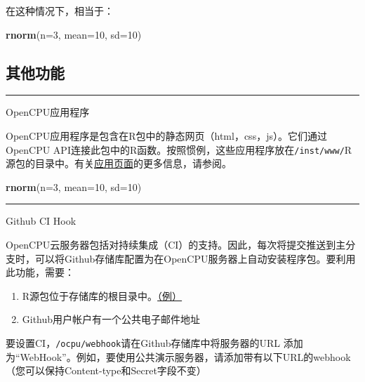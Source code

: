 \documentclass[]{book}
\newenvironment{Shaded}{\begin{snugshade}}{\end{snugshade}}
\newcommand{\KeywordTok}[1]{\textcolor[rgb]{0.13,0.29,0.53}{\textbf{#1}}}
\newcommand{\DataTypeTok}[1]{\textcolor[rgb]{0.13,0.29,0.53}{#1}}
\newcommand{\DecValTok}[1]{\textcolor[rgb]{0.00,0.00,0.81}{#1}}
\newcommand{\NormalTok}[1]{#1}
\providecommand{\tightlist}{%
  \setlength{\itemsep}{0pt}\setlength{\parskip}{0pt}}
\begin{document}
在这种情况下，相当于：

\begin{Shaded}
\begin{Highlighting}[]
\KeywordTok{rnorm}\NormalTok{(}\DataTypeTok{n=}\DecValTok{3}\NormalTok{, }\DataTypeTok{mean=}\DecValTok{10}\NormalTok{, }\DataTypeTok{sd=}\DecValTok{10}\NormalTok{)}
\end{Highlighting}
\end{Shaded}

\subsection{其他功能}

\begin{center}\rule{0.5\linewidth}{\linethickness}\end{center}

OpenCPU应用程序

OpenCPU应用程序是包含在R包中的静态网页（html，css，js）。它们通过OpenCPU
API连接此包中的R函数。按照惯例，这些应用程序放在\texttt{/inst/www/}R源包的目录中。有关\href{https://www.opencpu.org/apps.html}{应用页面}的更多信息，请参阅。

\begin{Shaded}
\begin{Highlighting}[]
\KeywordTok{rnorm}\NormalTok{(}\DataTypeTok{n=}\DecValTok{3}\NormalTok{, }\DataTypeTok{mean=}\DecValTok{10}\NormalTok{, }\DataTypeTok{sd=}\DecValTok{10}\NormalTok{)}
\end{Highlighting}
\end{Shaded}

\begin{center}\rule{0.5\linewidth}{\linethickness}\end{center}

Github CI Hook

OpenCPU云服务器包括对持续集成（CI）的支持。因此，每次将提交推送到主分支时，可以将Github存储库配置为在OpenCPU服务器上自动安装程序包。要利用此功能，需要：

\begin{enumerate}
\def\labelenumi{\arabic{enumi}.}
\tightlist
\item
  R源包位于存储库的根目录中。\href{https://github.com/rwebapps/appdemo}{（例）}
\item
  Github用户帐户有一个公共电子邮件地址
\end{enumerate}

要设置CI，\texttt{/ocpu/webhook}请在Github存储库中将服务器的URL
添加为``WebHook''。例如，要使用公共演示服务器，请添加带有以下URL的webhook（您可以保持Content-type和Secret字段不变）
\end{document}
